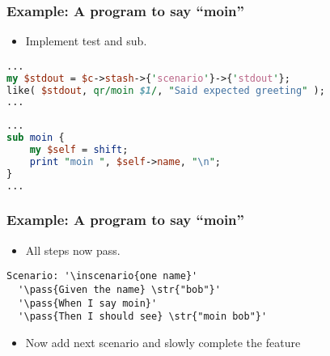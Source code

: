 \documentclass[10pt]{vcs_beamer}
\newcommand{\inscenario}[1]{\color{RoyalBlue}{#1}}
\newcommand{\str}[1]{\color{Turquoise}{#1}}
\newcommand{\pass}[1]{\color{ForestGreen}{#1}}
\begin{document}
\begin{frame}[fragile]
\frametitle{Example: A program to say ``moin''}

\begin{itemize}
    \item Implement  test and  sub.
\end{itemize}

\begin{lstlisting}[language=perl]
...
my $stdout = $c->stash->{'scenario'}->{'stdout'};
like( $stdout, qr/moin $1/, "Said expected greeting" );
...
\end{lstlisting}

\begin{lstlisting}[language=perl]
...
sub moin {
    my $self = shift;
    print "moin ", $self->name, "\n";
}
...
\end{lstlisting}

\end{frame}

\begin{frame}[fragile]
\frametitle{Example: A program to say ``moin''}

\begin{itemize}
    \item All steps now pass.
\end{itemize}

\begin{lstlisting}[escapeinside='']
Scenario: '\inscenario{one name}'
  '\pass{Given the name} \str{"bob"}'
  '\pass{When I say moin}'
  '\pass{Then I should see} \str{"moin bob"}'
\end{lstlisting}

\begin{itemize}
    \item Now add next scenario and slowly complete the feature
\end{itemize}

\end{frame}
\end{document}
